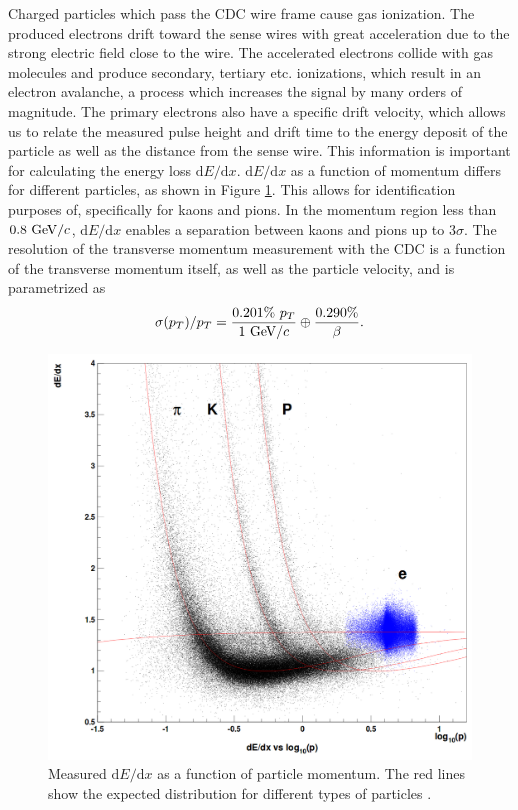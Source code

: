Charged particles which pass the CDC wire frame cause gas ionization. The produced electrons drift toward the sense wires with great acceleration due to the strong electric field close to the wire. The accelerated electrons collide with gas molecules and produce secondary, tertiary etc. ionizations, which result in an electron avalanche, a process which increases the signal by many orders of magnitude. The primary electrons also have a specific drift velocity, which allows us to relate the measured pulse height and drift time to the energy deposit of the particle as well as the distance from the sense wire. This information is important for calculating the energy loss $\mathrm{d}E/\mathrm{d}x$. $\mathrm{d}E/\mathrm{d}x$ as a function of momentum differs for different particles, as shown in Figure \ref{fig:dEdx}. This allows for identification purposes of, specifically for kaons and pions. In the momentum region less than $0.8\mathrm{~GeV}/c$, $\mathrm{d}E/\mathrm{d}x$ enables a separation between kaons and pions up to $3\sigma$. The resolution of the transverse momentum measurement with the CDC is a function of the transverse momentum itself, as well as the particle velocity, and is parametrized as
\begin{equation}
\sigma(p_T)/p_T = \frac{0.201\%~p_T}{1\mathrm{~GeV}/c} \oplus \frac{0.290\%}{\beta}.
\end{equation}

\begin{figure}[!htb]
	\centering
	\captionsetup{width=0.8\linewidth}
	\includegraphics[width=0.6\linewidth]{fig/setup/dEdx}
	\caption{Measured $\mathrm{d}E/\mathrm{d}x$ as a function of particle momentum. The red lines show the expected distribution for different types of particles \cite{ABASHIAN2002117}.}
	\label{fig:dEdx}
\end{figure}

